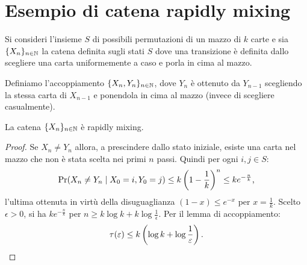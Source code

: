 %
%
%
%


\section{Esempio di catena rapidly mixing}
Si consideri l'insieme $S$ di possibili permutazioni di un mazzo di $k$ carte e sia $\chain X$ la catena definita sugli stati $S$ dove una transizione è definita dallo scegliere una carta uniformemente a caso e porla in cima al mazzo.

Definiamo l'accoppiamento $\{X_n,Y_n\}_{n\in\N}$, dove $Y_n$ è ottenuto da $Y_{n-1}$ scegliendo la stessa carta di $X_{n-1}$ e ponendola in cima al mazzo (invece di scegliere casualmente).

\begin{thm}
	La catena $\chain X$ è rapidly mixing.
\end{thm}
\begin{proof}
	Se $X_n\ne Y_n$ allora, a prescindere dallo stato iniziale, esiste una carta nel mazzo che non è stata scelta nei primi $n$ passi. Quindi per ogni $i,j\in S$:
	\begin{equation*}
		\Pr(X_n\ne Y_n\mid X_0=i,Y_0=j) \le k\left(1-\frac 1k\right)^n \le ke^{-\frac nk} \text,
	\end{equation*}
	l'ultima ottenuta in virtù della disuguaglianza $(1-x)\le e^{-x}$ per $x=\frac 1k$.
	Scelto $\epsilon>0$, si ha $ke^{-\frac nk}$ per $n\ge k\log k+k\log\frac{1}{\epsilon}$. Per il lemma di accoppiamento:
	\begin{equation*}
		\tau(\epsilon)\le k\left(\log k+\log\frac{1}{\epsilon}\right) \text. \qedhere
	\end{equation*}
\end{proof}
